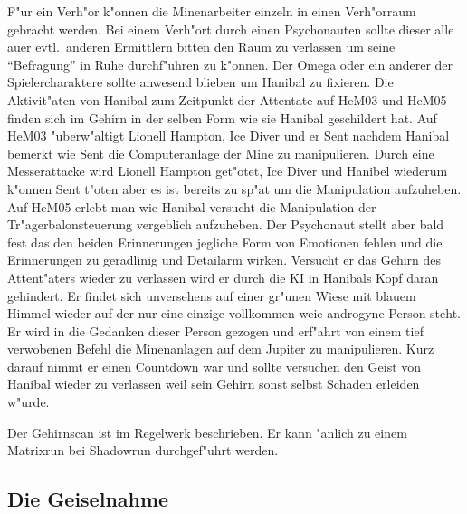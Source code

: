 F"ur ein Verh"or k"onnen die Minenarbeiter einzeln in einen Verh"orraum gebracht werden. Bei einem Verh"ort durch einen Psychonauten sollte dieser alle au\3er evtl.~anderen Ermittlern bitten den Raum zu verlassen um seine "`Befragung"' in Ruhe durchf"uhren zu k"onnen. Der Omega oder ein anderer der Spielercharaktere sollte anwesend blieben um Hanibal zu fixieren. Die Aktivit"aten von Hanibal zum Zeitpunkt der Attentate auf HeM03 und HeM05 finden sich im Gehirn in der selben Form wie sie Hanibal geschildert hat. Auf HeM03 "uberw"altigt Lionell Hampton, Ice Diver und er Sent nachdem Hanibal bemerkt wie Sent die Computeranlage der Mine zu manipulieren. Durch eine Messerattacke wird Lionell Hampton get"otet, Ice Diver und Hanibel wiederum k"onnen Sent t"oten aber es ist bereits zu sp"at um die Manipulation aufzuheben. Auf HeM05 erlebt man wie Hanibal versucht die Manipulation der Tr"agerbalonsteuerung vergeblich aufzuheben. Der Psychonaut stellt aber bald fest das den beiden Erinnerungen jegliche Form von Emotionen fehlen und die Erinnerungen zu geradlinig und Detailarm wirken. Versucht er das Gehirn des Attent"aters wieder zu verlassen wird er durch die KI in Hanibals Kopf daran gehindert. Er findet sich unversehens auf einer gr"unen Wiese mit blauem Himmel wieder auf der nur eine einzige vollkommen wei\3e androgyne Person steht. Er wird in die Gedanken dieser Person gezogen und erf"ahrt von einem tief verwobenen Befehl die Minenanlagen auf dem Jupiter zu manipulieren. Kurz darauf nimmt er einen Countdown war und sollte versuchen den Geist von Hanibal wieder zu verlassen weil sein Gehirn sonst selbst Schaden erleiden w"urde.

\begin{remarks}
	Der Gehirnscan ist im Regelwerk beschrieben. Er kann "anlich zu einem Matrixrun bei Shadowrun durchgef"uhrt werden.
\end{remarks}

\subsection{Die Geiselnahme}

